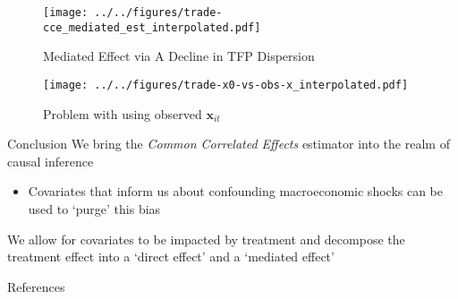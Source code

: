 \documentclass[aspectratio=169,t,11pt,table]{beamer}
\def\*#1{\mathbf{#1}}
\begin{document}
\begin{frame}
  \begin{figure}
    \caption{Mediated Effect via A Decline in TFP Dispersion}
    \texttt{[image: ../../figures/trade-cce\_mediated\_est\_interpolated.pdf]}
  \end{figure}
\end{frame}

\begin{frame}
  \begin{figure}
    \caption{Problem with using observed $\*x_{it}$}
    \texttt{[image: ../../figures/trade-x0-vs-obs-x\_interpolated.pdf]}
  \end{figure}
\end{frame}

\begin{frame}{Conclusion}
  We bring the \emph{Common Correlated Effects} estimator into the realm of causal inference
  \begin{itemize}
    \item Covariates that inform us about confounding macroeconomic shocks can be used to `purge' this bias
  \end{itemize}

  \bigskip
  We allow for covariates to be impacted by treatment and decompose the treatment effect into a `direct effect' and a `mediated effect'
\end{frame}




\begin{frame}{References}
  \thispagestyle{empty}
  \printbibliography
\end{frame}
\end{document}
